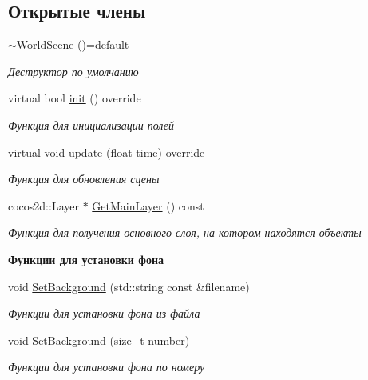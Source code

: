 \subsection*{Открытые члены}
\begin{DoxyCompactItemize}
\item 
\mbox{\label{classrtm_1_1_world_scene_a0e7f98986330555b5fcecf218915e623}} 
\hyperlink{classrtm_1_1_world_scene_a0e7f98986330555b5fcecf218915e623}{$\sim$\+World\+Scene} ()=default
\begin{DoxyCompactList}\small\item\em Деструктор по умолчанию \end{DoxyCompactList}\item 
virtual bool \hyperlink{classrtm_1_1_world_scene_a53da1782e50b99e90831bceb54c69ab9}{init} () override
\begin{DoxyCompactList}\small\item\em Функция для инициализации полей \end{DoxyCompactList}\item 
virtual void \hyperlink{classrtm_1_1_world_scene_a243c2d00cc0e525738b099eea7120fba}{update} (float time) override
\begin{DoxyCompactList}\small\item\em Функция для обновления сцены \end{DoxyCompactList}\item 
cocos2d\+::\+Layer $\ast$ \hyperlink{classrtm_1_1_world_scene_a33b06df7f231db363d6894408e16e225}{Get\+Main\+Layer} () const
\begin{DoxyCompactList}\small\item\em Функция для получения основного слоя, на котором находятся объекты \end{DoxyCompactList}\end{DoxyCompactItemize}
\begin{Indent}\textbf{ Функции для установки фона}\par
\begin{DoxyCompactItemize}
\item 
void \hyperlink{classrtm_1_1_world_scene_accf4ad079366ad6ca9731bff83d937c0}{Set\+Background} (std\+::string const \&filename)
\begin{DoxyCompactList}\small\item\em Функции для установки фона из файла \end{DoxyCompactList}\item 
void \hyperlink{classrtm_1_1_world_scene_a097fa828c003f8757faf1aebdd0e63f1}{Set\+Background} (size\+\_\+t number)
\begin{DoxyCompactList}\small\item\em Функции для установки фона по номеру \end{DoxyCompactList}\end{DoxyCompactItemize}
\end{Indent}

